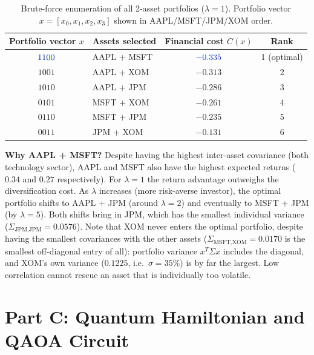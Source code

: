 \documentclass[a4paper,11pt]{article}
\newcommand{\cblu}[1]{\textcolor{ibmblue}{#1}}
\begin{document}
\begin{table}[H]
\centering
\caption{Brute-force enumeration of all 2-asset portfolios ($\lambda=1$).
Portfolio vector $x=[x_0,x_1,x_2,x_3]$ shown in AAPL/MSFT/JPM/XOM order.}
\label{tab:bf}
\begin{tabular}{clcc}
    \toprule
    Portfolio vector $x$ & Assets selected & Financial cost $C(x)$ & Rank \\
    \midrule
    $\cblu{1100}$ & \cblu{AAPL + MSFT} & $\cblu{-0.335}$ & \cblu{1 (optimal)} \\
    $1001$ & AAPL + XOM        & $-0.313$ & 2 \\
    $1010$ & AAPL + JPM        & $-0.286$ & 3 \\
    $0101$ & MSFT + XOM        & $-0.261$ & 4 \\
    $0110$ & MSFT + JPM        & $-0.235$ & 5 \\
    $0011$ & JPM  + XOM        & $-0.131$ & 6 \\
    \bottomrule
\end{tabular}
\end{table}

\begin{finbox}
\textbf{Why AAPL + MSFT?} Despite having the highest inter-asset
covariance (both technology sector), AAPL and MSFT also have the
highest expected returns ($0.34$ and $0.27$ respectively). For
$\lambda=1$ the return advantage outweighs the diversification cost.
As $\lambda$ increases (more risk-averse investor), the optimal
portfolio shifts to AAPL + JPM (around $\lambda=2$) and eventually to
MSFT + JPM (by $\lambda=5$). Both shifts bring in JPM, which has the
smallest individual variance ($\Sigma_{\text{JPM,JPM}}=0.0576$).
Note that XOM never enters the optimal portfolio, despite having the
smallest covariances with the other assets
($\Sigma_{\text{MSFT,XOM}}=0.0170$ is the smallest off-diagonal entry
of all): portfolio variance $x^T\Sigma x$ includes the diagonal, and
XOM's own variance ($0.1225$, i.e.\ $\sigma=35\%$) is by far the
largest. Low correlation cannot rescue an asset that is individually
too volatile.
\end{finbox}

\section{Part C: Quantum Hamiltonian and QAOA Circuit}
\end{document}
